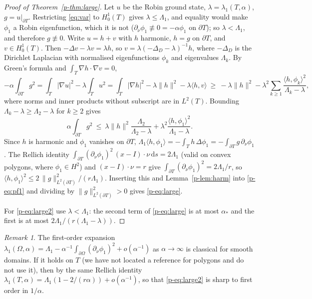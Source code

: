 \documentclass[11pt]{article}
\theoremstyle{remark}
\newtheorem{remark}[theorem]{Remark}
\newcommand{\dd}{\,\mathrm{d}}
\begin{document}
\begin{proof}[Proof of Theorem~\ref{p-thm:large}]
Let $u$ be the Robin ground state, $\lambda=\lambda_1(T,\alpha)$, $g=u|_{\partial T}$. Restricting
\eqref{eq:var} to $H^1_0(T)$ gives $\lambda\le\Lambda_1$, and equality would make $\phi_1$ a Robin
eigenfunction, which it is not ($\partial_\nu\phi_1\not\equiv0=-\alpha\phi_1$ on $\partial T$); so
$\lambda<\Lambda_1$, and therefore $g\not\equiv0$. Write $u=h+v$ with
$h$ harmonic, $h=g$ on $\partial T$, and $v\in H^1_0(T)$. Then $-\Delta v-\lambda v=\lambda h$, so
$v=\lambda(-\Delta_D-\lambda)^{-1}h$, where $-\Delta_D$ is the Dirichlet Laplacian with
normalised eigenfunctions $\phi_k$ and eigenvalues $\Lambda_k$. By Green's formula and
$\int_T\nabla h\cdot\nabla v=0$,
\[
  -\alpha\int_{\partial T}g^2=\int_T|\nabla u|^2-\lambda\int_Tu^2
  =\int_T|\nabla h|^2-\lambda\|h\|^2-\lambda\langle h,v\rangle
  \ \ge\ -\lambda\|h\|^2-\lambda^2\sum_{k\ge1}\frac{\langle h,\phi_k\rangle^2}{\Lambda_k-\lambda},
\]
where norms and inner products without subscript are in $L^2(T)$. Bounding
$\Lambda_k-\lambda\ge\Lambda_2-\lambda$ for $k\ge2$ gives
\begin{equation}\label{p-eq:pf1}
  \alpha\int_{\partial T}g^2\ \le\ \lambda\|h\|^2\frac{\Lambda_2}{\Lambda_2-\lambda}
  +\lambda^2\frac{\langle h,\phi_1\rangle^2}{\Lambda_1-\lambda}.
\end{equation}
Since $h$ is harmonic and $\phi_1$ vanishes on $\partial T$,
$\Lambda_1\langle h,\phi_1\rangle=-\int_Th\,\Delta\phi_1=-\int_{\partial T}g\,\partial_\nu\phi_1$.
The Rellich identity $\int_{\partial T}(\partial_\nu\phi_1)^2\,(x-I)\cdot\nu\dd s=2\Lambda_1$
(valid on convex polygons, where $\phi_1\in H^2$) and $(x-I)\cdot\nu=r$ give
$\int_{\partial T}(\partial_\nu\phi_1)^2=2\Lambda_1/r$, so
$\langle h,\phi_1\rangle^2\le 2\,\|g\|_{L^2(\partial T)}^2/(r\Lambda_1)$. Inserting this and
Lemma~\ref{p-lem:harm} into \eqref{p-eq:pf1} and dividing by $\|g\|^2_{L^2(\partial T)}>0$ gives
\eqref{p-eq:large}.

For \eqref{p-eq:large2} use $\lambda<\Lambda_1$: the second term of \eqref{p-eq:large} is at most
$\alpha_*$ and the first is at most $2\Lambda_1/(r(\Lambda_1-\lambda))$.
\end{proof}

\begin{remark}\label{p-rem:sharp}
The first-order expansion $\lambda_1(\Omega,\alpha)=\Lambda_1-\alpha^{-1}\int_{\partial\Omega}
(\partial_\nu\phi_1)^2+o(\alpha^{-1})$ as $\alpha\to\infty$ is classical for smooth domains. If it
holds on $T$ (we have not located a reference for polygons and do not use it), then by the same
Rellich identity $\lambda_1(T,\alpha)=\Lambda_1(1-2/(r\alpha))+o(\alpha^{-1})$, so that
\eqref{p-eq:large2} is sharp to first order in $1/\alpha$.
\end{remark}
\end{document}
